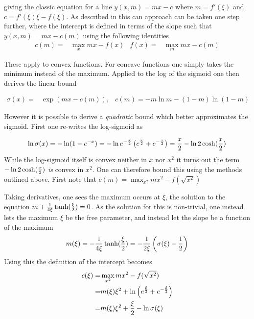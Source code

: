 giving the classic equation for a line $y(x, m) = mx - c$ where $m = f'(\xi)$ and $c = f'(\xi)\xi - f(\xi)$. As described in \cite{JordanBook1999} this can approach can be taken one step further, where the intercept is defined in terms of the slope such that $y(x, m) = mx - c(m)$ using the following identities
\begin{align}
c(m) = & \max _x mx - f(x) & f(x) = & \max _m mx - c(m)
\end{align}

These apply to convex functions. For concave functions one simply takes the minimum instead of the maximum. Applied to the log of the sigmoid one then derives the linear bound

\begin{align}
\sigma(x) = & \exp(mx - c(m)), & c(m) = -m \ln m - (1-m) \ln (1-m)
\end{align}

However it is possible to derive a \emph{quadratic} bound which better approximates the sigmoid. First one re-writes the log-sigmoid as

\begin{equation}
\ln \sigma(x) = -\ln (1 - e^{-x}) = -\ln e^{-\frac{x}{2}} \left( e^{\frac{x}{2}} + e^{-\frac{x}{2}} \right) = \frac{x}{2} - \ln 2 \cosh (\frac{x}{2}) \label{eqn:jaakkola-start-point}
\end{equation}
 While the log-sigmoid itself is convex neither in $x$ nor $x^2$ it turns out the term $-\ln 2 \cosh (\frac{x}{2})$ \emph{is} convex in $x^2$. One can therefore bound this using the methods outlined above. First note that $c(m) = \max_{x^2} mx^2 - f(\sqrt{x^2})$ 

Taking derivatives, one sees the maximum occurs at $\xi$, the solution to the equation $m + \frac{1}{4 \xi} \tanh (\frac{\xi}{2}) = 0$. As the solution for this is non-trivial, one instead lets the maximum $\xi$ be the free parameter, and instead let the slope be a function of the maximum
\begin{align}
m(\xi) = -\frac{1}{4\xi} \tanh (\frac{\xi}{2}) = -\frac{1}{2\xi} \left(\sigma(\xi) - \frac{1}{2}\right)
\end{align}
Using this the definition of the intercept becomes
\begin{align}
\begin{split}
c(\xi) = & \max_{x^2} mx^2 - f(\sqrt{x^2}) \\
 = & m(\xi)\xi^2 + \ln \left(e^{\frac{\xi}{2}} + e^{-\frac{\xi}{2}} \right) \\
 = & m(\xi)\xi^2 + \frac{\xi}{2} - \ln \sigma (\xi)
\end{split}
\end{align}


